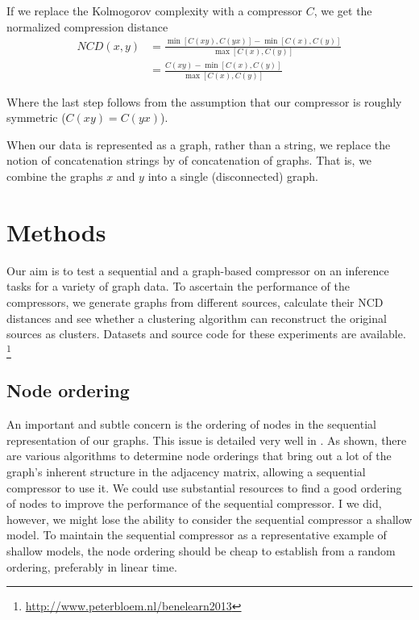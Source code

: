 \documentclass{article}
\begin{document}
If we replace the Kolmogorov complexity with a compressor $C$, we get the normalized compression distance
\begin{align*}
NCD(x, y) 
	&= \frac{\min \left [C(xy), C(yx)\right ] - \min \left[C(x), C(y)\right]}{\max \left [C(x), C(y) \right ]}\\
	&= \frac{C(xy) - \min \left[C(x), C(y)\right]}{\max \left [C(x), C(y) \right ]} 
\end{align*}
 
Where the last step follows from the assumption that our compressor is roughly symmetric ($C(xy) = C(yx)$).

When our data is represented as a graph, rather than a string, we replace the notion of concatenation strings by of concatenation of graphs. That is, we combine the graphs $x$ and $y$ into a single (disconnected) graph.

\section*{Methods}

Our aim is to test a sequential and a graph-based compressor on an inference tasks for a variety of graph data. To ascertain the performance of the compressors, we generate graphs from different sources, calculate their NCD distances and see whether a clustering algorithm can reconstruct the original sources as clusters. Datasets and source code for these experiments are available. \footnote{\url{http://www.peterbloem.nl/benelearn2013}}

\subsection*{Node ordering}

An important and subtle concern is the ordering of nodes in the sequential representation of our graphs. This issue is detailed very well in \cite{kang2011beyond}. As shown, there are various algorithms to determine node orderings that bring out a lot of the graph's inherent structure in the adjacency matrix, allowing a sequential compressor to use it. We could use substantial resources to find a good ordering of nodes to improve the performance of the sequential compressor. I we did, however, we might lose the ability to consider the sequential compressor a shallow model. To maintain the sequential compressor as a representative example of shallow models, the node ordering should be cheap to establish from a random ordering, preferably in linear time. 
\end{document}
